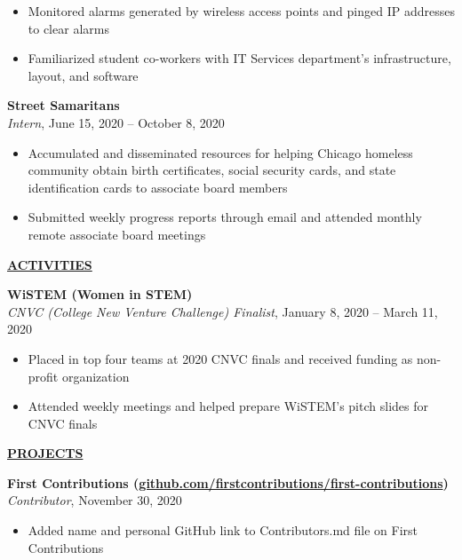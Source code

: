 \documentclass[
]{article}
\providecommand{\tightlist}{%
  \setlength{\itemsep}{0pt}\setlength{\parskip}{0pt}}
\begin{document}
\begin{itemize}
\item
  Monitored alarms generated by wireless access points and pinged IP
  addresses to clear alarms
\item
  Familiarized student co-workers with IT Services department's
  infrastructure, layout, and software
\end{itemize}

\textbf{Street Samaritans}\\
\emph{Intern}, June 15, 2020 -- October 8, 2020

\begin{itemize}
\item
  Accumulated and disseminated resources for helping Chicago homeless
  community obtain birth certificates, social security cards, and state
  identification cards to associate board members
\item
  Submitted weekly progress reports through email and attended monthly
  remote associate board meetings
\end{itemize}

\textbf{\underline{ACTIVITIES}}

\textbf{WiSTEM (Women in STEM)}\\
\emph{CNVC (College New Venture Challenge) Finalist}, January 8, 2020 --
March 11, 2020

\begin{itemize}
\tightlist
\item
  Placed in top four teams at 2020 CNVC finals and received funding as
  non-profit organization
\end{itemize}

\begin{itemize}
\tightlist
\item
  Attended weekly meetings and helped prepare WiSTEM's pitch slides for
  CNVC finals
\end{itemize}

\textbf{\underline{PROJECTS}}

\textbf{First Contributions
(\href{https://www.github.com/firstcontributions/first-contributions}{github.com/firstcontributions/first-contributions})}\\
\emph{Contributor}, November 30, 2020

\begin{itemize}
\tightlist
\item
  Added name and personal GitHub link to Contributors.md file on First
  Contributions
\end{itemize}
\end{document}
